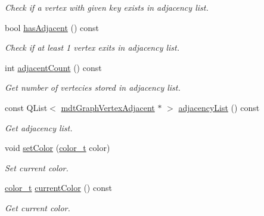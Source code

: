 \begin{DoxyCompactItemize}
\begin{DoxyCompactList}\small\item\em Check if a vertex with given key exists in adjacency list. \end{DoxyCompactList}\item 
\hypertarget{classmdt_graph_vertex_a014fec1f4de3b2c96b62a61d3f2f6e83}{
bool \hyperlink{classmdt_graph_vertex_a014fec1f4de3b2c96b62a61d3f2f6e83}{hasAdjacent} () const }
\label{classmdt_graph_vertex_a014fec1f4de3b2c96b62a61d3f2f6e83}

\begin{DoxyCompactList}\small\item\em Check if at least 1 vertex exits in adjacency list. \end{DoxyCompactList}\item 
\hypertarget{classmdt_graph_vertex_adacea133413ed6425d4b68c6068c4904}{
int \hyperlink{classmdt_graph_vertex_adacea133413ed6425d4b68c6068c4904}{adjacentCount} () const }
\label{classmdt_graph_vertex_adacea133413ed6425d4b68c6068c4904}

\begin{DoxyCompactList}\small\item\em Get number of vertecies stored in adjacency list. \end{DoxyCompactList}\item 
\hypertarget{classmdt_graph_vertex_ad74ae1eb0d8633124a4ce0efdca31279}{
const QList$<$ \hyperlink{classmdt_graph_vertex_adjacent}{mdtGraphVertexAdjacent} $\ast$ $>$ \hyperlink{classmdt_graph_vertex_ad74ae1eb0d8633124a4ce0efdca31279}{adjacencyList} () const }
\label{classmdt_graph_vertex_ad74ae1eb0d8633124a4ce0efdca31279}

\begin{DoxyCompactList}\small\item\em Get adjacency list. \end{DoxyCompactList}\item 
\hypertarget{classmdt_graph_vertex_a00363bfaf2a2d2933776f1d66627dc12}{
void \hyperlink{classmdt_graph_vertex_a00363bfaf2a2d2933776f1d66627dc12}{setColor} (\hyperlink{classmdt_graph_vertex_ae658709c9b5a918bf614bfbf79ac49a5}{color\_\-t} color)}
\label{classmdt_graph_vertex_a00363bfaf2a2d2933776f1d66627dc12}

\begin{DoxyCompactList}\small\item\em Set current color. \end{DoxyCompactList}\item 
\hypertarget{classmdt_graph_vertex_aeab9e151337603b9b29f14f71f20a93a}{
\hyperlink{classmdt_graph_vertex_ae658709c9b5a918bf614bfbf79ac49a5}{color\_\-t} \hyperlink{classmdt_graph_vertex_aeab9e151337603b9b29f14f71f20a93a}{currentColor} () const }
\label{classmdt_graph_vertex_aeab9e151337603b9b29f14f71f20a93a}

\begin{DoxyCompactList}\small\item\em Get current color. \end{DoxyCompactList}\end{DoxyCompactItemize}



